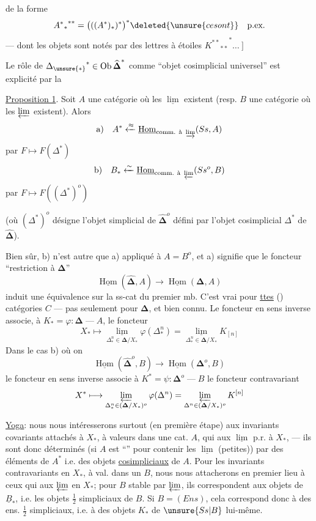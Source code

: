 de la forme
\[
 {{A^*}_*}^{**}=\bigl(( (A^*)_* )^*\bigr)^*
 \deleted{\unsure{ce sont}}\quad\text{p.ex.}
\]
--- dont les objets sont notés par des lettres à étoiles
$ {{K^{**}}_{**}}^*\ldots\ \Big]$

Le rôle de ${\Delta_{\unsure{*}}}^{*}\in\operatorname{Ob}\widehat{\boldsymbol\Delta}^{*}$
comme ``objet cosimplicial universel'' est explicité par la

\uline{Proposition 1}. Soit $A$ une catégorie où les $\underline{\lim}$ existent
(resp. $B$ une catégorie où les $\varprojlim$ existent). Alors
\[
 \text{a)}\quad A^*\xleftarrow{\approx}
 \underline{\operatorname{Hom}}_{\text{comm. à }\varinjlim}(Ss,A)
\]
par $F\longmapsto F(\Delta^*)$
\[
 \text{b)}\quad B_*\xleftarrow{\sim}
 \underline{\operatorname{Hom}}_{\text{comm. à }\varprojlim}(Ss^o,B)
\]
par $F\longmapsto F((\Delta^*)^o)$

(où $(\Delta^*)^o$ désigne l'objet simplicial de $\widehat{\boldsymbol\Delta}^{o}$
défini par l'objet cosimplicial $\Delta^*$ de $\widehat{\boldsymbol\Delta}$).

Bien sûr, b) n'est autre que a) appliqué à $A=B^o$, et a) signifie que
le foncteur ``restriction à $\boldsymbol\Delta$''
\[
 \underline{\operatorname{Hom}}(\widehat{\boldsymbol\Delta},A)
 \longrightarrow\underline{\operatorname{Hom}}(\boldsymbol\Delta,A)
\]
induit une équivalence sur la ss-cat
du premier mb. C'est vrai pour \uline{ttes}
() catégories $C$ ---
pas seulement pour $\boldsymbol\Delta$, et bien connu.
Le foncteur en sens inverse associe, à
$K_*=\varphi:\boldsymbol\Delta\mathbin{\text{---}}A$, le foncteur
\[
 X_*\longmapsto
 \underset{\Delta^n_*\in\boldsymbol\Delta/X_*}{\underline{\lim}}
 \varphi(\Delta^n_*)=
 \underset{\Delta^n_*\in\boldsymbol\Delta/X_*}{\underline{\lim}}K_{[n]}
\]
Dans le cas b) où on 
\[
 \underline{\operatorname{Hom}}(\widehat{\boldsymbol\Delta}^{o},B)
 \longrightarrow\underline{\operatorname{Hom}}(\boldsymbol\Delta^{o},B)
\]
le foncteur en sens inverse associe à
$K^*=\psi:\boldsymbol\Delta^o\mathbin{\text{---}}B$
le foncteur contravariant
\[
 X^*\longmapsto
 \varprojlim_{\Delta^n_*\in(\boldsymbol\Delta/X_*)^o}\varphi(\Delta^n)
 =\varprojlim_{\Delta^n\in(\boldsymbol\Delta/X_*)^o}K^{[n]}
\]

\uline{Yoga}: nous nous intéresserons surtout
 (en première étape) aux invariants covariants attachés à $X_*$,
à valeurs dans une cat. $A$, qui 
aux $\underline{\lim}$ p.r. à $X_*$, --- ils sont donc déterminés
(si $A$ est ``'' pour contenir les $\underline{\lim}$
(petites)) par des éléments de $A^*$ i.e. des objets \uline{cosimpliciaux} de $A$.
Pour les invariants contravariants en $X_*$, à val. dans un $B$, nous nous
attacherons en premier lieu à ceux qui  aux $\varprojlim$
en $X_*$; pour $B$ stable par $\varprojlim$, ils correspondent
 aux objets de $\underline B_*$, i.e. les objets
$\tfrac12$ simpliciaux de $B$. Si $B=(Ens)$, cela correspond donc à des
ens. $\tfrac12$ simpliciaux, i.e. à des objets $K_*$ de
$\unsure{Ss|B}$ lui-même.

